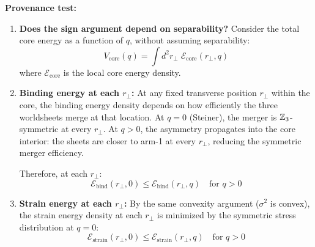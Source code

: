 \textbf{Provenance test:}
\begin{enumerate}
    \item \textbf{Does the sign argument depend on separability?}
          Consider the total core energy as a function of $q$, without
          assuming separability:
          \begin{equation}
              V_{\mathrm{core}}(q) = \int d^2 r_\perp\;
              \mathcal{E}_{\mathrm{core}}(r_\perp, q)
              \label{eq:NMCP_nonsep_Vcore}
          \end{equation}
          where $\mathcal{E}_{\mathrm{core}}$ is the local core energy
          density.

    \item \textbf{Binding energy at each $r_\perp$:}
          At any fixed transverse position $r_\perp$ within the core,
          the binding energy density depends on how efficiently the three
          worldsheets merge at that location. At $q = 0$ (Steiner), the
          merger is $\mathbb{Z}_3$-symmetric at every $r_\perp$. At $q > 0$,
          the asymmetry propagates into the core interior: the sheets
          are closer to arm-1 at every $r_\perp$, reducing the symmetric
          merger efficiency.

          Therefore, at each $r_\perp$:
          \begin{equation}
              \mathcal{E}_{\mathrm{bind}}(r_\perp, 0)
              \leq \mathcal{E}_{\mathrm{bind}}(r_\perp, q)
              \quad \text{for } q > 0
              \label{eq:NMCP_bind_local}
          \end{equation}

    \item \textbf{Strain energy at each $r_\perp$:}
          By the same convexity argument ($\sigma^2$ is convex), the
          strain energy density at each $r_\perp$ is minimized by the
          symmetric stress distribution at $q = 0$:
          \begin{equation}
              \mathcal{E}_{\mathrm{strain}}(r_\perp, 0)
              \leq \mathcal{E}_{\mathrm{strain}}(r_\perp, q)
              \quad \text{for } q > 0
              \label{eq:NMCP_strain_local}
          \end{equation}


\end{enumerate}
